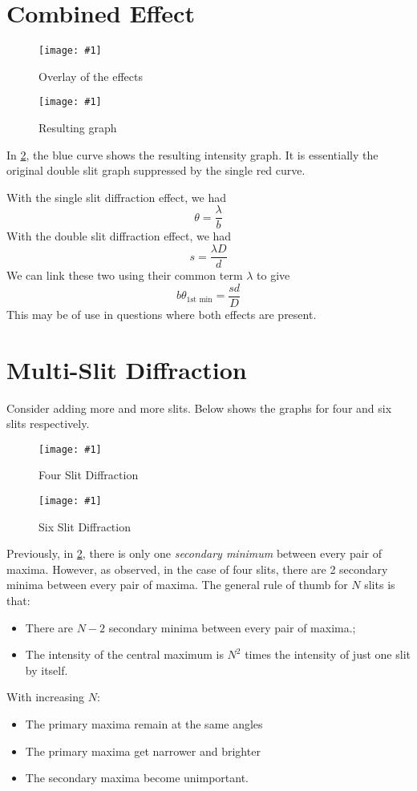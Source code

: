 \documentclass[a4paper,12pt]{article}
\let\oldsection\section
\renewcommand\section{\clearpage\oldsection}
\newcommand{\img}[4]{\begin{center}
  \begin{figure}[H]
    \centering
    \texttt{[image: \#1]}
    \caption{#3}
    \label{fig:#4}
  \end{figure}
\end{center}}
\begin{document}
\section{Combined Effect}

\begin{minipage}{0.475\textwidth}
  \img{combine1.png}{1}{Overlay of the effects}{combined}
\end{minipage}\hspace*{0.05\textwidth}%
\begin{minipage}{0.475\textwidth}
  \img{combine2.png}{1}{Resulting graph}{combined2}
\end{minipage}

In \cref{fig:combined2}, the blue curve shows the resulting intensity graph. It is essentially the original double slit graph suppressed by the single red curve.

With the single slit diffraction effect, we had $$\theta = \frac{\lambda}{b}$$
With the double slit diffraction effect, we had $$s = \frac{\lambda D}{d}$$
We can link these two using their common term $\lambda$ to give
$$b\theta_\text{1st min} = \frac{sd}{D}$$
This may be of use in questions where both effects are present.


\section{Multi-Slit Diffraction}

Consider adding more and more slits. Below shows the graphs for four and six slits respectively.

\begin{minipage}{0.475\textwidth}
  \img{fourslit.png}{1}{Four Slit Diffraction}{fourslit}
\end{minipage}\hspace*{0.05\textwidth}%
\begin{minipage}{0.475\textwidth}
  \img{sixslit.png}{1}{Six Slit Diffraction}{sixslit}
\end{minipage}

Previously, in \cref{fig:combined2}, there is only one \textit{secondary minimum} between every pair of maxima. However, as observed, in the case of four slits, there are 2 secondary minima between every pair of maxima. The general rule of thumb for $N$ slits is that:
\begin{itemize}
  \item There are $N - 2$ secondary minima between every pair of maxima.;
  \item The intensity of the central maximum is $N^2$ times the intensity of just one slit by itself.
\end{itemize}
With increasing $N$:
\begin{itemize}
  \item The primary maxima remain at the same angles
  \item The primary maxima get narrower and brighter
  \item The secondary maxima become unimportant.
\end{itemize}
\end{document}
